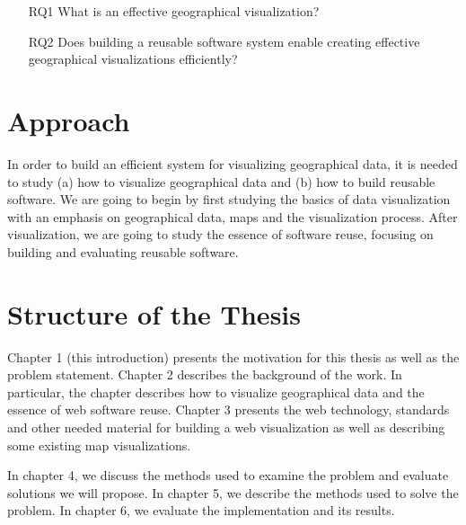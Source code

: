 \begin{enumerate}
	\item[RQ1] What is an effective geographical visualization? 
	\item[RQ2] Does building a reusable software system enable creating effective geographical visualizations efficiently?
\end{enumerate}

\section{Approach}

In order to build an efficient system for visualizing geographical data, it is needed to study (a) how to visualize geographical data and (b) how to build reusable software. We are going to begin by first studying the basics of data visualization with an emphasis on geographical data, maps and the visualization process. After visualization, we are going to study the essence of software reuse, focusing on building and evaluating reusable software. 



\section{Structure of the Thesis}
\label{section:structure} 

 Chapter 1 (this introduction) presents the motivation for this thesis as well as the problem statement. Chapter 2 describes the background of the work. In particular, the chapter describes how to visualize geographical data and the essence of web software reuse. Chapter 3 presents the web technology, standards and other needed material for building a web visualization as well as describing some existing map visualizations.

In chapter 4, we discuss the methods used to examine the problem and evaluate solutions we will propose. In chapter 5, we describe the methods used to solve the problem. In chapter 6, we evaluate the implementation and its results. 



